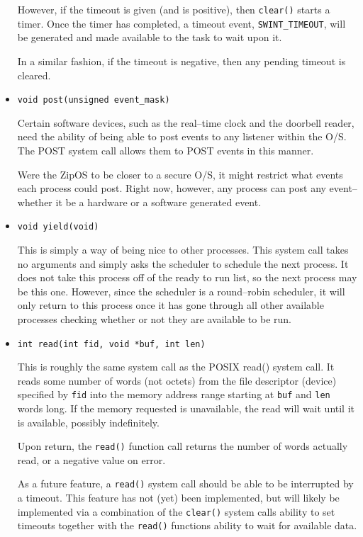 \documentclass{gqtekspec}
\begin{document}
\begin{itemize}
	However, if the timeout is given (and is positive), then {\tt clear()}
	starts a timer.  Once the timer has completed, a timeout event,
	{\tt SWINT\_TIMEOUT}, will be generated and made available to the task
	to wait upon it.

	In a similar fashion, if the timeout is negative, then any pending
	timeout is cleared.

\item {\tt void post(unsigned event\_mask)}

	Certain software devices, such as the real--time clock and the doorbell
	reader, need the ability of being able to post events to any listener
	within the O/S.  The POST system call allows them to POST events in
	this manner.

	Were the ZipOS to be closer to a secure O/S, it might restrict what
	events each process could post.  Right now, however, any process can
	post any event--whether it be a hardware or a software generated event.

\item {\tt void yield(void) }

	This is simply a way of being nice to other processes.  This system
	call takes no arguments and simply asks the scheduler to schedule the
	next process.  It does not take this process off of the ready to run
	list, so the next process may be this one.  However, since the scheduler
	is a round--robin scheduler, it will only return to this process once
	it has gone through all other available processes checking whether or
	not they are available to be run.

\item {\tt int read(int fid, void *buf, int len)}

	This is roughly the same system call as the POSIX read() system
	call.  It reads some number of words (not octets) from the file
	descriptor (device) specified by {\tt fid} into the memory address
	range starting at {\tt buf} and {\tt len} words long.  If the memory
	requested is unavailable,
	the read will wait until it is available, possibly indefinitely.

	Upon return, the {\tt read()} function call returns the number of
	words actually read, or a negative value on error.

	As a future feature, a {\tt read()} system call should be able to be
	interrupted by a timeout.  This feature has not (yet) been implemented,
	but will likely be implemented via a combination of the {\tt clear()}
	system calls ability to set timeouts together with the {\tt read()}
	functions ability to wait for available data.


\end{itemize}
\end{document}
